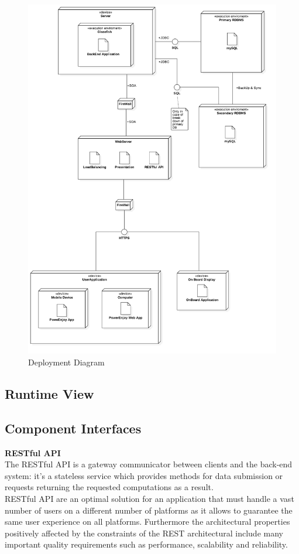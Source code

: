 \FloatBarrier
\begin{figure}
\centering
\hspace{-5mm}
\includegraphics[scale=0.38]{Images/DeployDiagram/Deploy2.png}
\caption{Deployment Diagram}
\end{figure}
\FloatBarrier


\subsection{Runtime View}
\newpage


\subsection{Component Interfaces}
\label{sec:CInter}

\textbf{RESTful API}\\The RESTful API is a gateway communicator between clients and the back-end system: it's a stateless service which provides methods for data submission or requests returning the requested computations as a result.\\
RESTful API are an optimal solution for an application that must handle a vast number of users on a different number of platforms as it allows to guarantee the same user experience on all platforms. Furthermore the architectural properties positively affected by the constraints of the REST architectural include many important quality requirements such as performance, scalability and reliability.
\newpage
